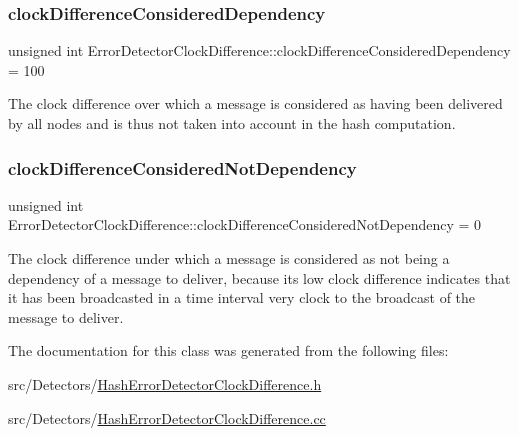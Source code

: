 \subsubsection{\texorpdfstring{clock\+Difference\+Considered\+Dependency}{clockDifferenceConsideredDependency}}
{\footnotesize\ttfamily unsigned int Error\+Detector\+Clock\+Difference\+::clock\+Difference\+Considered\+Dependency = 100\hspace{0.3cm}{\ttfamily [private]}}



The clock difference over which a message is considered as having been delivered by all nodes and is thus not taken into account in the hash computation. 

\mbox{\label{class_error_detector_clock_difference_aa733fc7d2023d62a7418ca20e01e9f5a}} 
\subsubsection{\texorpdfstring{clock\+Difference\+Considered\+Not\+Dependency}{clockDifferenceConsideredNotDependency}}
{\footnotesize\ttfamily unsigned int Error\+Detector\+Clock\+Difference\+::clock\+Difference\+Considered\+Not\+Dependency = 0\hspace{0.3cm}{\ttfamily [private]}}



The clock difference under which a message is considered as not being a dependency of a message to deliver, because its low clock difference indicates that it has been broadcasted in a time interval very clock to the broadcast of the message to deliver. 



The documentation for this class was generated from the following files\+:\begin{DoxyCompactItemize}
\item 
src/\+Detectors/\hyperlink{_hash_error_detector_clock_difference_8h}{Hash\+Error\+Detector\+Clock\+Difference.\+h}\item 
src/\+Detectors/\hyperlink{_hash_error_detector_clock_difference_8cc}{Hash\+Error\+Detector\+Clock\+Difference.\+cc}\end{DoxyCompactItemize}

